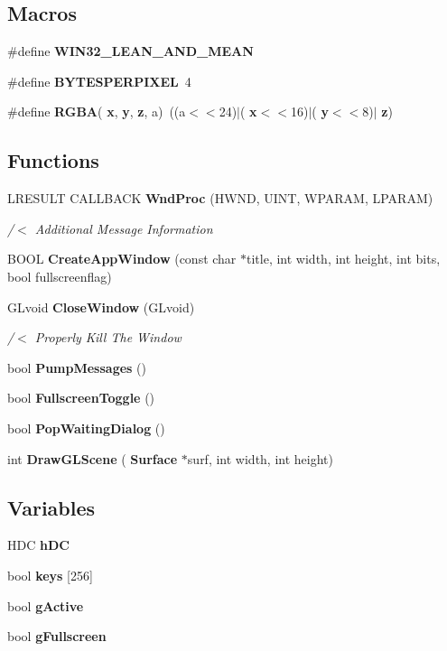 \subsection*{Macros}
\begin{DoxyCompactItemize}
\item 
\#define \textbf{ W\+I\+N32\+\_\+\+L\+E\+A\+N\+\_\+\+A\+N\+D\+\_\+\+M\+E\+AN}
\item 
\#define \textbf{ B\+Y\+T\+E\+S\+P\+E\+R\+P\+I\+X\+EL}~4
\item 
\#define \textbf{ R\+G\+BA}(\textbf{ x},  \textbf{ y},  \textbf{ z},  a)~((a$<$$<$24)$\vert$(\textbf{ x}$<$$<$16)$\vert$(\textbf{ y}$<$$<$8)$\vert$\textbf{ z})
\end{DoxyCompactItemize}
\subsection*{Functions}
\begin{DoxyCompactItemize}
\item 
L\+R\+E\+S\+U\+LT C\+A\+L\+L\+B\+A\+CK \textbf{ Wnd\+Proc} (H\+W\+ND, U\+I\+NT, W\+P\+A\+R\+AM, L\+P\+A\+R\+AM)
\begin{DoxyCompactList}\small\item\em /$<$ Additional Message Information \end{DoxyCompactList}\item 
B\+O\+OL \textbf{ Create\+App\+Window} (const char $\ast$title, int width, int height, int bits, bool fullscreenflag)
\item 
G\+Lvoid \textbf{ Close\+Window} (G\+Lvoid)
\begin{DoxyCompactList}\small\item\em /$<$ Properly Kill The Window \end{DoxyCompactList}\item 
bool \textbf{ Pump\+Messages} ()
\item 
bool \textbf{ Fullscreen\+Toggle} ()
\item 
bool \textbf{ Pop\+Waiting\+Dialog} ()
\item 
int \textbf{ Draw\+G\+L\+Scene} (\textbf{ Surface} $\ast$surf, int width, int height)
\end{DoxyCompactItemize}
\subsection*{Variables}
\begin{DoxyCompactItemize}
\item 
H\+DC \textbf{ h\+DC}
\item 
bool \textbf{ keys} [256]
\item 
bool \textbf{ g\+Active}
\item 
bool \textbf{ g\+Fullscreen}
\end{DoxyCompactItemize}


